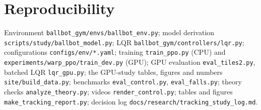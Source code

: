 \documentclass[conference]{IEEEtran}
\theoremstyle{remark}
\begin{document}
\section{Reproducibility}
Environment \texttt{ballbot\_gym/envs/ballbot\_env.py}; model derivation \texttt{scripts/study/ballbot\_model.py}; LQR \texttt{ballbot\_gym/controllers/lqr.py}; configurations \texttt{configs/env/*.yaml}; training \texttt{train\_ppo.py} (CPU) and \texttt{experiments/warp\_ppo/train\_dev.py} (GPU); GPU evaluation \texttt{eval\_tiles2.py}, batched LQR \texttt{lqr\_gpu.py}; the GPU-study tables, figures and numbers \texttt{site/build\_data.py}; benchmarks \texttt{eval\_control.py}, \texttt{eval\_falls.py}; theory checks \texttt{analyze\_theory.py}; videos \texttt{render\_control.py}; tables and figures \texttt{make\_tracking\_report.py}; decision log \texttt{docs/research/tracking\_study\_log.md}.
\end{document}
